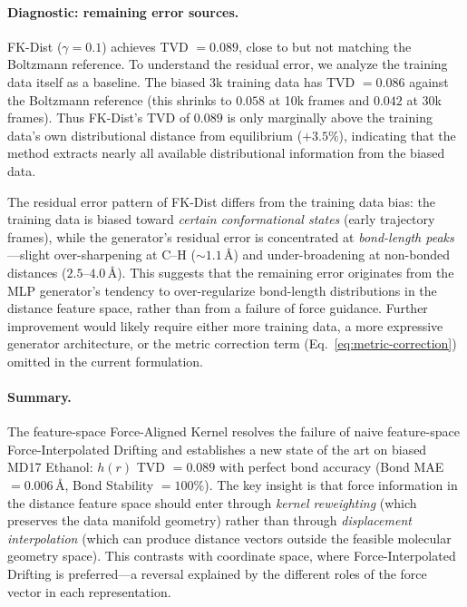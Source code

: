 \documentclass[11pt]{article}
\begin{document}
\paragraph{Diagnostic: remaining error sources.}
FK-Dist ($\gamma = 0.1$) achieves TVD $= 0.089$, close to but not matching the Boltzmann reference.
To understand the residual error, we analyze the training data itself as a baseline.
The biased 3k training data has TVD $= 0.086$ against the Boltzmann reference (this shrinks to $0.058$ at 10k frames and $0.042$ at 30k frames).
Thus FK-Dist's TVD of $0.089$ is only marginally above the training data's own distributional distance from equilibrium ($+3.5\%$), indicating that the method extracts nearly all available distributional information from the biased data.

The residual error pattern of FK-Dist differs from the training data bias: the training data is biased toward \emph{certain conformational states} (early trajectory frames), while the generator's residual error is concentrated at \emph{bond-length peaks}---slight over-sharpening at C--H (${\sim}1.1$\,\AA) and under-broadening at non-bonded distances ($2.5$--$4.0$\,\AA).
This suggests that the remaining error originates from the MLP generator's tendency to over-regularize bond-length distributions in the distance feature space, rather than from a failure of force guidance.
Further improvement would likely require either more training data, a more expressive generator architecture, or the metric correction term (Eq.~\ref{eq:metric-correction}) omitted in the current formulation.

\paragraph{Summary.}
The feature-space Force-Aligned Kernel resolves the failure of naive feature-space Force-Interpolated Drifting and establishes a new state of the art on biased MD17 Ethanol: $h(r)$ TVD $= 0.089$ with perfect bond accuracy (Bond MAE $= 0.006$\,\AA, Bond Stability $= 100\%$).
The key insight is that force information in the distance feature space should enter through \emph{kernel reweighting} (which preserves the data manifold geometry) rather than through \emph{displacement interpolation} (which can produce distance vectors outside the feasible molecular geometry space).
This contrasts with coordinate space, where Force-Interpolated Drifting is preferred---a reversal explained by the different roles of the force vector in each representation.
\end{document}
